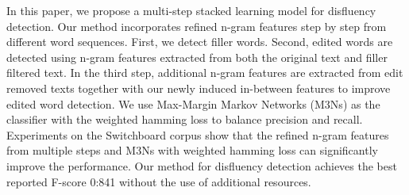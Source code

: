 In this paper, we propose a multi-step stacked learning model for disfluency detection. Our method incorporates refined n-gram features step by step from
 different word sequences. First, we detect filler words. Second, edited words
 are detected using n-gram features extracted from both the original text and
 filler filtered text. In the third step, additional n-gram features are
 extracted from edit removed texts together with our newly induced in-between
 features to improve edited word detection. We use Max-Margin Markov Networks
 (M3Ns) as the classifier with the weighted hamming loss to balance precision
 and recall. Experiments on the Switchboard corpus show that the refined n-gram
 features from multiple steps and M3Ns with weighted hamming loss can
 significantly improve the performance. Our method for disfluency detection
 achieves the best reported F-score 0:841 without the use of additional
 resources.

